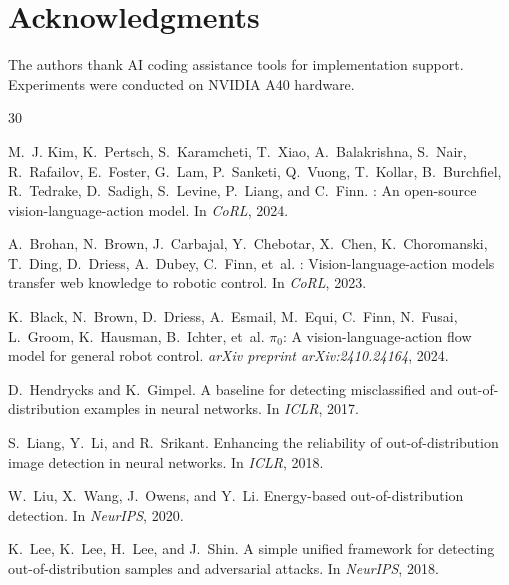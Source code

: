 \documentclass[11pt]{article}
\begin{document}
\section*{Acknowledgments}

The authors thank AI coding assistance tools for implementation support.
Experiments were conducted on NVIDIA A40 hardware.

\begin{thebibliography}{30}

M.~J. Kim, K.~Pertsch, S.~Karamcheti, T.~Xiao, A.~Balakrishna, S.~Nair, R.~Rafailov, E.~Foster, G.~Lam, P.~Sanketi, Q.~Vuong, T.~Kollar, B.~Burchfiel, R.~Tedrake, D.~Sadigh, S.~Levine, P.~Liang, and C.~Finn.
: An open-source vision-language-action model.
\newblock In \emph{CoRL}, 2024.

A.~Brohan, N.~Brown, J.~Carbajal, Y.~Chebotar, X.~Chen, K.~Choromanski, T.~Ding, D.~Driess, A.~Dubey, C.~Finn, et~al.
: Vision-language-action models transfer web knowledge to robotic control.
\newblock In \emph{CoRL}, 2023.

K.~Black, N.~Brown, D.~Driess, A.~Esmail, M.~Equi, C.~Finn, N.~Fusai, L.~Groom, K.~Hausman, B.~Ichter, et~al.
\newblock $\pi_0$: A vision-language-action flow model for general robot control.
\newblock \emph{arXiv preprint arXiv:2410.24164}, 2024.

D.~Hendrycks and K.~Gimpel.
\newblock A baseline for detecting misclassified and out-of-distribution examples in neural networks.
\newblock In \emph{ICLR}, 2017.

S.~Liang, Y.~Li, and R.~Srikant.
\newblock Enhancing the reliability of out-of-distribution image detection in neural networks.
\newblock In \emph{ICLR}, 2018.

W.~Liu, X.~Wang, J.~Owens, and Y.~Li.
\newblock Energy-based out-of-distribution detection.
\newblock In \emph{NeurIPS}, 2020.

K.~Lee, K.~Lee, H.~Lee, and J.~Shin.
\newblock A simple unified framework for detecting out-of-distribution samples and adversarial attacks.
\newblock In \emph{NeurIPS}, 2018.


\end{thebibliography}
\end{document}
